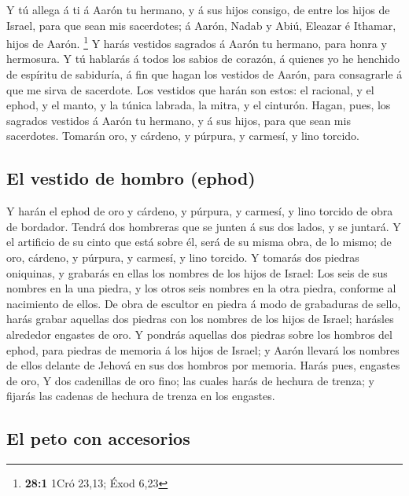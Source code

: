  Y tú allega á ti á Aarón tu hermano, y á sus hijos consigo,
de entre los hijos de Israel, para que sean mis sacerdotes; á Aarón,
Nadab y Abiú, Eleazar é Ithamar, hijos de Aarón. \footnote{\textbf{28:1}
  1Cró 23,13; Éxod 6,23}  Y harás vestidos sagrados á Aarón
tu hermano, para honra y hermosura.  Y tú hablarás á todos
los sabios de corazón, á quienes yo he henchido de espíritu de
sabiduría, á fin que hagan los vestidos de Aarón, para consagrarle á que
me sirva de sacerdote.  Los vestidos que harán son estos: el
racional, y el ephod, y el manto, y la túnica labrada, la mitra, y el
cinturón. Hagan, pues, los sagrados vestidos á Aarón tu hermano, y á sus
hijos, para que sean mis sacerdotes.  Tomarán oro, y
cárdeno, y púrpura, y carmesí, y lino torcido.

\hypertarget{el-vestido-de-hombro-ephod}{%
\subsection{El vestido de hombro
(ephod)}\label{el-vestido-de-hombro-ephod}}

 Y harán el ephod de oro y cárdeno, y púrpura, y carmesí, y
lino torcido de obra de bordador.  Tendrá dos hombreras que
se junten á sus dos lados, y se juntará.  Y el artificio de
su cinto que está sobre él, será de su misma obra, de lo mismo; de oro,
cárdeno, y púrpura, y carmesí, y lino torcido.  Y tomarás
dos piedras oniquinas, y grabarás en ellas los nombres de los hijos de
Israel:  Los seis de sus nombres en la una piedra, y los
otros seis nombres en la otra piedra, conforme al nacimiento de ellos.
 De obra de escultor en piedra á modo de grabaduras de
sello, harás grabar aquellas dos piedras con los nombres de los hijos de
Israel; harásles alrededor engastes de oro.  Y pondrás
aquellas dos piedras sobre los hombros del ephod, para piedras de
memoria á los hijos de Israel; y Aarón llevará los nombres de ellos
delante de Jehová en sus dos hombros por memoria.  Harás
pues, engastes de oro,  Y dos cadenillas de oro fino; las
cuales harás de hechura de trenza; y fijarás las cadenas de hechura de
trenza en los engastes.

\hypertarget{el-peto-con-accesorios}{%
\subsection{El peto con accesorios}\label{el-peto-con-accesorios}}

